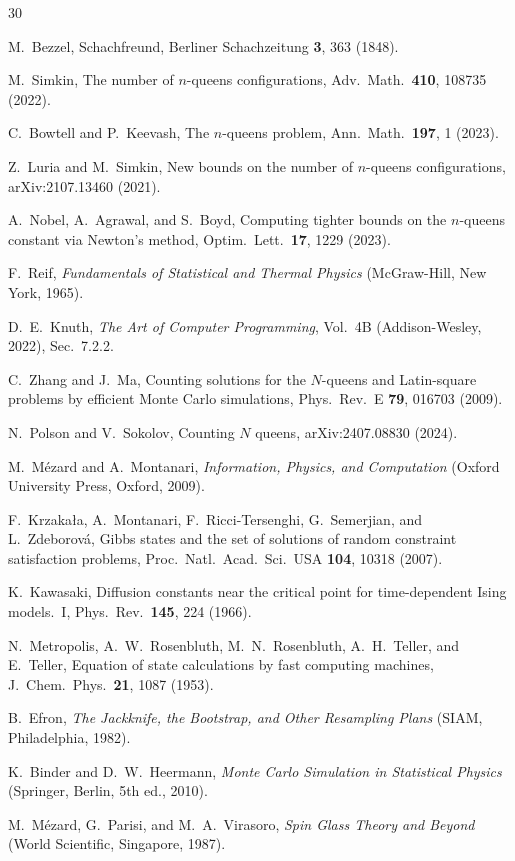 \documentclass[aps, pre, reprint, amsmath, amssymb, superscriptaddress, floatfix]{revtex4-2}
\begin{document}
\begin{thebibliography}{30}

M.~Bezzel,
Schachfreund, Berliner Schachzeitung \textbf{3}, 363 (1848).

M.~Simkin,
The number of $n$-queens configurations,
Adv.\ Math.\ \textbf{410}, 108735 (2022).

C.~Bowtell and P.~Keevash,
The $n$-queens problem,
Ann.\ Math.\ \textbf{197}, 1 (2023).

Z.~Luria and M.~Simkin,
New bounds on the number of $n$-queens configurations,
arXiv:2107.13460 (2021).

A.~Nobel, A.~Agrawal, and S.~Boyd,
Computing tighter bounds on the $n$-queens constant via Newton's
method,
Optim.\ Lett.\ \textbf{17}, 1229 (2023).

F.~Reif,
\textit{Fundamentals of Statistical and Thermal Physics}
(McGraw-Hill, New York, 1965).

D.~E.~Knuth,
\textit{The Art of Computer Programming}, Vol.~4B
(Addison-Wesley, 2022), Sec.~7.2.2.

C.~Zhang and J.~Ma,
Counting solutions for the $N$-queens and Latin-square problems by
efficient Monte Carlo simulations,
Phys.\ Rev.\ E \textbf{79}, 016703 (2009).

N.~Polson and V.~Sokolov,
Counting $N$ queens,
arXiv:2407.08830 (2024).

M.~M\'ezard and A.~Montanari,
\textit{Information, Physics, and Computation}
(Oxford University Press, Oxford, 2009).

F.~Krzaka{\l}a, A.~Montanari, F.~Ricci-Tersenghi,
G.~Semerjian, and L.~Zdeborov\'a,
Gibbs states and the set of solutions of random constraint
satisfaction problems,
Proc.\ Natl.\ Acad.\ Sci.\ USA \textbf{104}, 10318 (2007).

K.~Kawasaki,
Diffusion constants near the critical point for time-dependent Ising
models.\ I,
Phys.\ Rev.\ \textbf{145}, 224 (1966).

N.~Metropolis, A.~W.~Rosenbluth, M.~N.~Rosenbluth, A.~H.~Teller,
and E.~Teller,
Equation of state calculations by fast computing machines,
J.~Chem.~Phys.\ \textbf{21}, 1087 (1953).

B.~Efron,
\textit{The Jackknife, the Bootstrap, and Other Resampling Plans}
(SIAM, Philadelphia, 1982).

K.~Binder and D.~W.~Heermann,
\textit{Monte Carlo Simulation in Statistical Physics}
(Springer, Berlin, 5th ed., 2010).

M.~M\'ezard, G.~Parisi, and M.~A.~Virasoro,
\textit{Spin Glass Theory and Beyond}
(World Scientific, Singapore, 1987).

\end{thebibliography}
\end{document}

